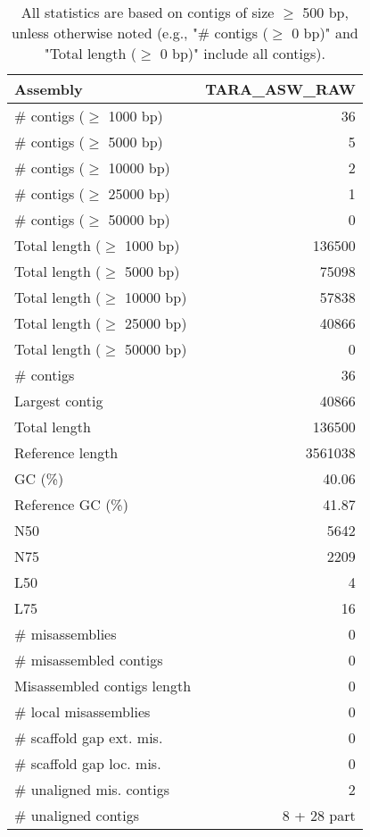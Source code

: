 \documentclass[12pt,a4paper]{article}
\begin{document}
\begin{table}[ht]
\begin{center}
\caption{All statistics are based on contigs of size $\geq$ 500 bp, unless otherwise noted (e.g., "\# contigs ($\geq$ 0 bp)" and "Total length ($\geq$ 0 bp)" include all contigs).}
\begin{tabular}{|l*{1}{|r}|}
\hline
Assembly & TARA\_ASW\_RAW \\ \hline
\# contigs ($\geq$ 1000 bp) & 36 \\ \hline
\# contigs ($\geq$ 5000 bp) & 5 \\ \hline
\# contigs ($\geq$ 10000 bp) & 2 \\ \hline
\# contigs ($\geq$ 25000 bp) & 1 \\ \hline
\# contigs ($\geq$ 50000 bp) & 0 \\ \hline
Total length ($\geq$ 1000 bp) & 136500 \\ \hline
Total length ($\geq$ 5000 bp) & 75098 \\ \hline
Total length ($\geq$ 10000 bp) & 57838 \\ \hline
Total length ($\geq$ 25000 bp) & 40866 \\ \hline
Total length ($\geq$ 50000 bp) & 0 \\ \hline
\# contigs & 36 \\ \hline
Largest contig & 40866 \\ \hline
Total length & 136500 \\ \hline
Reference length & 3561038 \\ \hline
GC (\%) & 40.06 \\ \hline
Reference GC (\%) & 41.87 \\ \hline
N50 & 5642 \\ \hline
N75 & 2209 \\ \hline
L50 & 4 \\ \hline
L75 & 16 \\ \hline
\# misassemblies & 0 \\ \hline
\# misassembled contigs & 0 \\ \hline
Misassembled contigs length & 0 \\ \hline
\# local misassemblies & 0 \\ \hline
\# scaffold gap ext. mis. & 0 \\ \hline
\# scaffold gap loc. mis. & 0 \\ \hline
\# unaligned mis. contigs & 2 \\ \hline
\# unaligned contigs & 8 + 28 part \\ \hline

\end{tabular}
\end{center}
\end{table}
\end{document}
